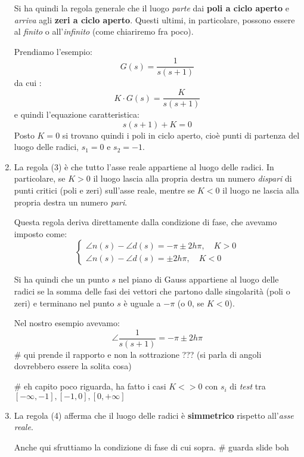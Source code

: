 \documentclass[a4paper,11pt]{article}
\begin{document}
\begin{enumerate}
Si ha quindi la regola generale che il luogo \textit{parte} dai \textbf{poli a ciclo aperto} e \textit{arriva} agli \textbf{zeri a ciclo aperto}.
Questi ultimi, in particolare, possono essere al \textit{finito} o all'\textit{infinito} (come chiariremo fra poco).

Prendiamo l'esempio:
$$
G(s) = \frac{1}{s (s + 1)}
$$
da cui :
$$
K \cdot G(s) = \frac{K}{s (s + 1)} 
$$
e quindi l'equazione caratteristica:
$$
s(s + 1) + K = 0
$$
Posto $K=0$ si trovano quindi i poli in ciclo aperto, cioè punti di partenza del luogo delle radici, $s_1 = 0$ e $s_2 = -1$.

\item
La regola (3) è che tutto l'asse reale appartiene al luogo delle radici.
In particolare, se $K > 0$ il luogo lascia alla propria destra un numero \textit{dispari} di punti critici (poli e zeri) sull'asse reale, mentre se $K < 0$ il luogo ne lascia alla propria destra un numero \textit{pari}.

Questa regola deriva direttamente dalla condizione di fase, che avevamo imposto come:
\[
	\begin{cases}
		\angle n(s) - \angle d(s) = -\pi \pm 2 h \pi, \quad K > 0 \\
		\angle n(s) - \angle d(s) = \pm 2 h \pi, \quad K < 0
	\end{cases}
\]

Si ha quindi che un punto $s$ nel piano di Gauss appartiene al luogo delle radici se la somma delle fasi dei vettori che partono dalle singolarità (poli o zeri) e terminano nel punto $s$ è uguale a $-\pi$ (o 0, se $K < 0$).

Nel nostro esempio avevamo: 
$$
\angle \frac{1}{s(s + 1)} = -\pi \pm 2 h \pi
$$ # qui prende il rapporto e non la sottrazione ??? (si parla di angoli dovrebbero essere la solita cosa)

# eh capito poco riguarda, ha fatto i casi $K <> 0$ con $s_i$ di \textit{test} tra $[-\infty, -1], [-1, 0], [0, +\infty]$

	\item
La regola (4) afferma che il luogo delle radici è \textbf{simmetrico} rispetto all'\textit{asse reale}.

Anche qui sfruttiamo la condizione di fase di cui sopra.
# guarda slide boh
\end{enumerate}
\end{document}
